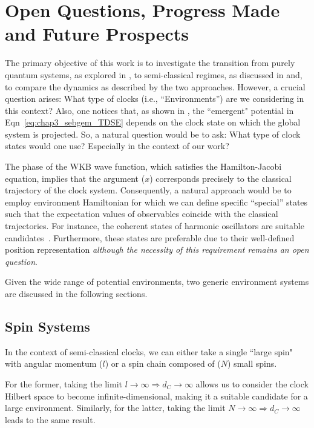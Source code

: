 \chapter{Open Questions, Progress Made and Future Prospects}

The primary objective of this work is to investigate the transition from purely quantum systems, 
as explored in , to semi-classical regimes, as discussed in
 and, to compare the dynamics
as described by the two approaches. However, a crucial question arises: What type of
clocks (i.e., ``Environments'') are we considering in this context? Also, one notices that, 
as shown in , the ``emergent" potential in
Eqn~\ref{eq:chap3_sebgem_TDSE} depends on the clock state on which the global system
is projected. So, a natural question would be to ask: What type of clock states would one use? Especially in the context of our work? 

The phase of the WKB wave function, which satisfies the Hamilton-Jacobi equation, implies
that the argument ($x$) corresponds precisely to the classical trajectory of the clock system. 
Consequently, a natural approach would be to employ environment Hamiltonian for which we can define specific ``special'' states such that the expectation values of observables coincide with 
the classical trajectories. For instance, the coherent states of harmonic oscillators are suitable
candidates~\cite{braun2004classical}. Furthermore, these states are preferable due to their well-defined position representation \textit{although the necessity of this requirement remains an open question}.

Given the wide range of potential environments, two generic environment systems are discussed in the following sections.
\section{Spin Systems}
In the context of semi-classical clocks, we can either take a single ``large spin" with angular momentum ($l$)
 or a spin chain composed of ($N$) small spins.

For the former, taking the limit $l \rightarrow \infty \Rightarrow d_C \rightarrow \infty$ allows us to consider the clock Hilbert
space to become infinite-dimensional, 
making it a suitable candidate for a large environment. Similarly, for the latter,
taking the limit $N \rightarrow \infty \Rightarrow d_C \rightarrow \infty$ leads to the same result.

